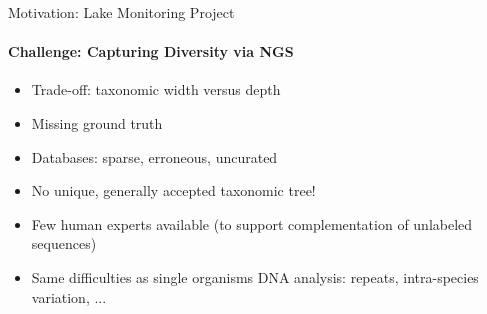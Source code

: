 \documentclass[xcolor=dvipsnames,envcountsect]{beamer}
\begin{document}


\begin{frame}{Motivation: Lake Monitoring Project}
\framesubtitle{Challenge: Capturing Diversity via NGS}
\begin{itemize}
    \item Trade-off: taxonomic width versus depth 
    \item Missing ground truth %
    \item Databases: sparse, erroneous, uncurated %
    \item No unique, generally accepted taxonomic tree!  %
    \item Few human experts available (to support complementation of unlabeled sequences)
    \item Same difficulties as single organisms DNA analysis: repeats, intra-species variation, ... 
\end{itemize}
\end{frame}
\end{document}
